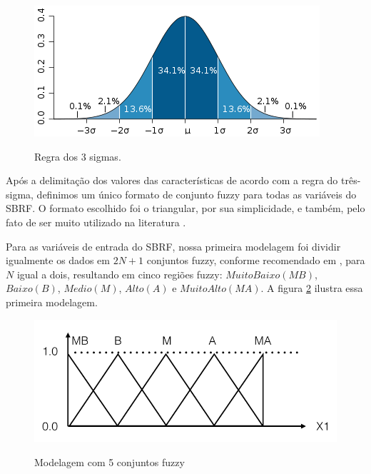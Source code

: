 \documentclass[template.tex]{subfiles}
\begin{document}
\begin{figure}[h]
\caption{Regra dos 3 sigmas.}
\centering
\includegraphics[scale=0.85]{regra-dos-3-sigma.png}
\label{figura:regra_3_sigmas}
\end{figure}

Após a delimitação dos valores das características de acordo com a regra do três-sigma, definimos um único formato de conjunto fuzzy para todas as variáveis do SBRF. O formato escolhido foi o triangular, por sua simplicidade, e também, pelo fato de ser muito utilizado na literatura \cite{alcala2009multiobjective, gacto2010integration, antonelli2012multi, cardenas2012multiobjective}.

Para as variáveis de entrada do SBRF, nossa primeira modelagem foi dividir igualmente os dados em $2N + 1$ conjuntos fuzzy, conforme recomendado em \cite{wang1992generating}, para $N$ igual a dois, resultando em cinco regiões fuzzy: $Muito Baixo (MB)$, $Baixo (B)$, $Medio (M)$, $Alto (A)$ e $Muito Alto (MA)$. A figura \ref{figura:cinco_conjuntos_fuzzy} ilustra essa primeira modelagem.

\begin{figure}[H]
\caption{Modelagem com 5 conjuntos fuzzy}
\centering
\includegraphics[scale=0.45]{cinco_conjuntos_fuzzy.png}
\label{figura:cinco_conjuntos_fuzzy}
\end{figure}
\end{document}
